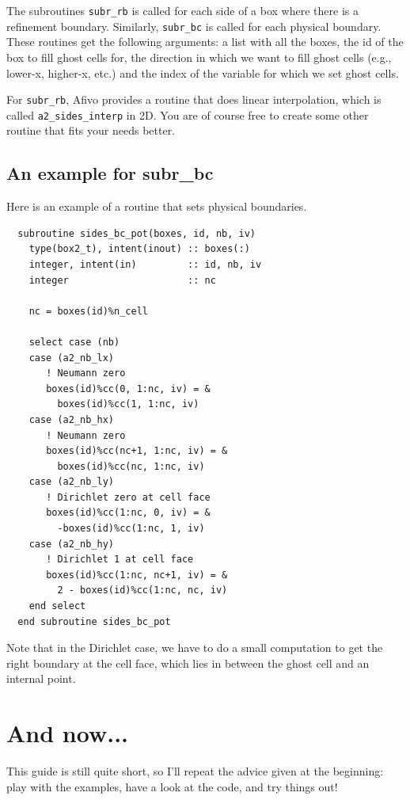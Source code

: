 \documentclass[a4paper, a4wide]{article}
\begin{document}
The subroutines \texttt{subr\_rb} is called for each side of a box where there
is a refinement boundary.
Similarly, \texttt{subr\_bc} is called for each physical boundary.
These routines get the following arguments: a list with all the boxes, the id of
the box to fill ghost cells for, the direction in which we want to fill ghost
cells (e.g., lower-x, higher-x, etc.)
and the index of the variable for which we set ghost cells.

For \texttt{subr\_rb}, Afivo provides a routine that does linear interpolation,
which is called \texttt{a2\_sides\_interp} in 2D.
You are of course free to create some other routine that fits your needs better.

\subsection{An example for subr\_bc}
\label{sec:ghost-cells-example}

Here is an example of a routine that sets physical boundaries.
\begin{lstlisting}
  subroutine sides_bc_pot(boxes, id, nb, iv)
    type(box2_t), intent(inout) :: boxes(:)
    integer, intent(in)         :: id, nb, iv
    integer                     :: nc

    nc = boxes(id)%n_cell

    select case (nb)
    case (a2_nb_lx)
       ! Neumann zero
       boxes(id)%cc(0, 1:nc, iv) = &
         boxes(id)%cc(1, 1:nc, iv)
    case (a2_nb_hx)
       ! Neumann zero
       boxes(id)%cc(nc+1, 1:nc, iv) = &
         boxes(id)%cc(nc, 1:nc, iv)
    case (a2_nb_ly)
       ! Dirichlet zero at cell face
       boxes(id)%cc(1:nc, 0, iv) = &
         -boxes(id)%cc(1:nc, 1, iv)
    case (a2_nb_hy)
       ! Dirichlet 1 at cell face
       boxes(id)%cc(1:nc, nc+1, iv) = &
         2 - boxes(id)%cc(1:nc, nc, iv)
    end select
  end subroutine sides_bc_pot
\end{lstlisting}

Note that in the Dirichlet case, we have to do a small computation to get the
right boundary at the cell face, which lies in between the ghost cell and an
internal point.

\section{And now...}

This guide is still quite short, so I'll repeat the advice given at the
beginning: play with the examples, have a look at the code, and try things out!
\end{document}
